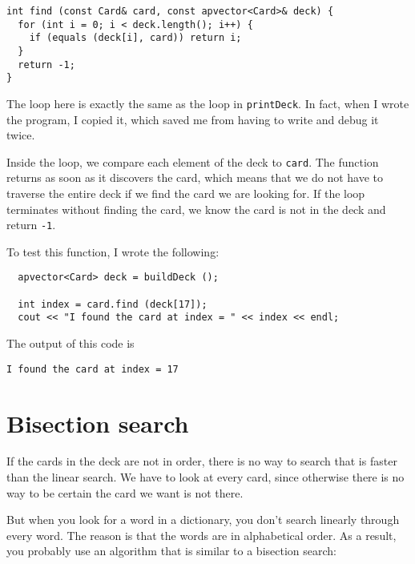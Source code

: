 \begin{verbatim}
int find (const Card& card, const apvector<Card>& deck) {
  for (int i = 0; i < deck.length(); i++) {
    if (equals (deck[i], card)) return i;
  }
  return -1;
}
\end{verbatim}
%
The loop here is exactly the same as the loop in {\tt printDeck}.
In fact, when I wrote the program, I copied it, which saved me
from having to write and debug it twice.

Inside the loop, we compare each element of the deck to
{\tt card}.  The function returns as soon as it discovers
the card, which means that we do not have to traverse the entire
deck if we find the card we are looking for.  If the loop terminates
without finding the card, we know the card is not in the deck
and return {\tt -1}.


To test this function, I wrote the following:

\begin{verbatim}
  apvector<Card> deck = buildDeck ();

  int index = card.find (deck[17]);
  cout << "I found the card at index = " << index << endl;
\end{verbatim}
%
The output of this code is

\begin{verbatim}
I found the card at index = 17
\end{verbatim}
%


\section{Bisection search}

If the cards in the deck are not in order, there is no way to search
that is faster than the linear search.  We have to look at every card,
since otherwise there is no way to be certain the card we want is not
there.

But when you look for a word in a dictionary, you don't search
linearly through every word.  The reason is that the words are in
alphabetical order.  As a result, you probably use an algorithm that
is similar to a bisection search:

